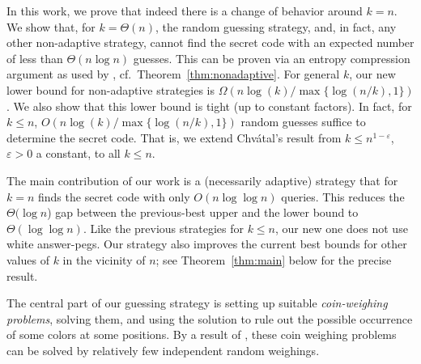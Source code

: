 \documentclass[english,a4paper,11pt]{article}
\newcommand{\eps}{{\varepsilon}}
\newcommand{\comment}[1]{{\bf [#1]}}
\newcommand{\HT}[1]{\comment{\textcolor{green}{HT: #1}}}
\newcommand{\BD}[1]{\comment{\textcolor{blue}{BD: #1}}}
\newcommand{\ifLongCites}[2]{#1}
\newcommand{\ifLongCites}[2]{#2}
\begin{document}
{In this work, we prove that indeed there is a change of behavior around $k = n$. We show that, for $k = \Theta(n)$, the random guessing strategy, and, in fact, any other non-adaptive strategy, cannot find the secret code with an expected number of less than $\Theta(n \log n)$ guesses. This can be proven via an entropy compression argument as used by \ifLongCites{\cite{Moser09}}{Moser~\cite{Moser09}}, cf.\ Theorem~\ref{thm:nonadaptive}. For general $k$, our new lower bound for non-adaptive strategies is $\Omega(n \log(k) / \max\{\log(n/k), 1\})$. 
We also show that this lower bound is tight (up to constant factors). 
In fact, for $k\leq n$, $O(n \log(k) / \max\{\log(n/k), 1\})$ random guesses suffice to determine the secret code. That is, we extend Chv\'atal's result from $k\leq n^{1-\eps}$, $\eps > 0$ a constant, to all $k\leq n$. 


The main contribution of our work is a (necessarily adaptive) strategy that for $k=n$ finds the secret code with only $O(n \log\log n)$ queries.  
This reduces the $\Theta(\log n$) gap between the previous-best upper and the lower bound to $\Theta(\log\log n)$. 
Like the previous strategies for $k \le n$, our new one does not use white answer-pegs. Our strategy also improves the current best bounds for other values of $k$ in the vicinity of $n$; see Theorem~\ref{thm:main} below for the precise result.

The central part of our guessing strategy is setting up suitable \emph{coin-weighing problems}, solving them, and using the solution to rule out the possible occurrence of some colors at some positions. By a result of \ifLongCites{\cite{grebinski-journal}}{Grebinski and Kucherov~\cite{grebinski-journal}}, these coin weighing problems can be solved by relatively few independent random weighings. 

}
\end{document}
